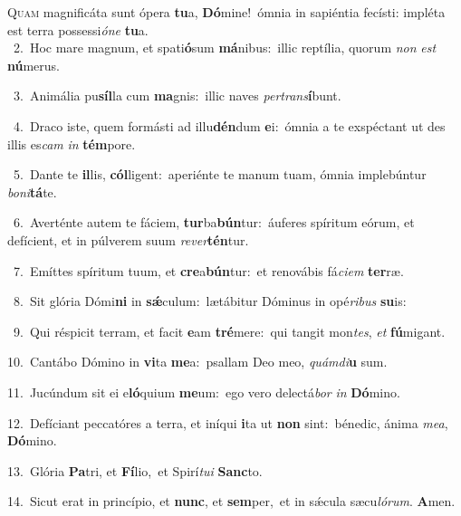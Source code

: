 \lettrine{\initial\textcolor{\initialcolor}{Q}}{uam} magnificáta sunt ópera \textbf{tu}\-a, \textbf{Dó}\-mine!~\star ómnia in sapiéntia fecísti: impléta est terra possessi\-\textit{ó}\-\textit{ne} \textbf{tu}\-a.\\
{\numbfont\textcolor{\numbcolor}{~2.}}~Hoc mare magnum, et spati\-\textbf{ó}\-sum \textbf{má}\-nibus:~\star illic reptília, quorum \textit{non} \textit{est} \textbf{nú}\-merus.\par
{\numbfont\textcolor{\numbcolor}{~3.}}~Animália pu\-\textbf{síl}\-la cum \textbf{ma}\-gnis:~\star illic naves \textit{per}\-\textit{trans}\textbf{í}bunt.\par
{\numbfont\textcolor{\numbcolor}{~4.}}~Draco iste, quem formásti ad illu\-\textbf{dén}\-dum \textbf{e}\-i:~\star ómnia a te exspéctant ut des illis es\textit{cam} \textit{in} \textbf{tém}\-pore.\par
{\numbfont\textcolor{\numbcolor}{~5.}}~Dante te \textbf{il}\-lis, \textbf{cól}\-ligent:~\star aperiénte te manum tuam, ómnia implebúntur \textit{bo}\-\textit{ni}\textbf{tá}te.\par
{\numbfont\textcolor{\numbcolor}{~6.}}~Averténte autem te fáciem, \textbf{tur}\-ba\-\textbf{bún}\-tur:~\star áuferes spíritum eórum, et defícient, et in púlverem suum \textit{re}\-\textit{ver}\textbf{tén}tur.\par
{\numbfont\textcolor{\numbcolor}{~7.}}~Emíttes spíritum tuum, et \textbf{cre}\-a\-\textbf{bún}\-tur:~\star et renovábis fá\-\textit{ci}\-\textit{em} \textbf{ter}\-ræ.\par
{\numbfont\textcolor{\numbcolor}{~8.}}~Sit glória Dómi\textbf{ni} in \textbf{sǽ}\-culum:~\star lætábitur Dóminus in opé\-\textit{ri}\-\textit{bus} \textbf{su}\-is:\par
{\numbfont\textcolor{\numbcolor}{~9.}}~Qui réspicit terram, et facit \textbf{e}\-am \textbf{tré}\-mere:~\star qui tangit mon\-\textit{tes}\-, \textit{et} \textbf{fú}\-migant.\par
{\numbfont\textcolor{\numbcolor}{10.}}~Cantábo Dómino in \textbf{vi}\-ta \textbf{me}\-a:~\star psallam Deo meo, \textit{quám}\-\textit{di}\textbf{u} sum.\par
{\numbfont\textcolor{\numbcolor}{11.}}~Jucúndum sit ei e\-\textbf{ló}\-quium \textbf{me}\-um:~\star ego vero delectá\textit{bor} \textit{in} \textbf{Dó}\-mino.\par
{\numbfont\textcolor{\numbcolor}{12.}}~Defíciant peccatóres a terra, et iníqui \textbf{i}\-ta ut \textbf{non} sint:~\star bénedic, ánima \textit{me}\-\textit{a}, \textbf{Dó}\-mino.\par
{\numbfont\textcolor{\numbcolor}{13.}}~Glória \textbf{Pa}\-tri, et \textbf{Fí}\-lio,~\star et Spirí\-\textit{tu}\-\textit{i} \textbf{Sanc}\-to.\par
{\numbfont\textcolor{\numbcolor}{14.}}~Sicut erat in princípio, et \textbf{nunc}\-, et \textbf{sem}\-per,~\star et in sǽcula sæcu\-\textit{ló}\-\textit{rum}. \textbf{A}\-men.\par
